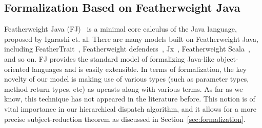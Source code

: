 \subsection{Formalization Based on Featherweight Java}
Featherweight Java (FJ)~\cite{Igarashi01FJ} is a minimal core calculus of the Java language, 
proposed by Igarashi et. al. There are many models built on Featherweight Java, 
including FeatherTrait~\cite{Liquori08ftj}, Featherweight defenders~\cite{goetz12fdefenders}, Jx~\cite{Nystrom2004}, 
Featherweight Scala~\cite{Cremet2006}, and so on.
FJ provides the standard model of formalizing Java-like object-oriented languages and 
is easily extensible. In terms of formalization, the key novelty of our model is making use of various types (such as parameter types, method return types, etc) as upcasts along with various terms. As far as we know, this technique has not appeared in the literature before. This notion is of vital importance in our hierarchical dispatch algorithm, and it allows for a
more precise subject-reduction theorem as discussed in
Section~\ref{sec:formalization}.








